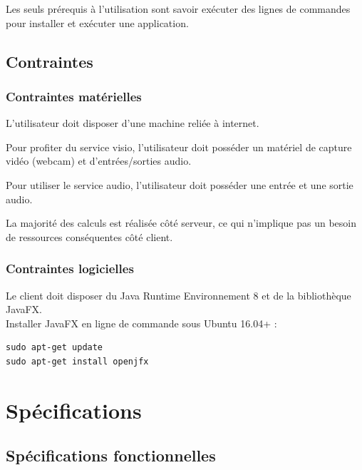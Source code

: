 \documentclass[11pt,dvipsnames,svgnames]{report}
\begin{document}
Les seuls prérequis à l'utilisation sont savoir exécuter des lignes de commandes pour installer et exécuter une application.
\section{Contraintes}
\subsection{Contraintes matérielles}
L'utilisateur doit disposer d'une machine reliée à internet.

Pour profiter du service visio, l'utilisateur doit posséder un matériel de capture vidéo (webcam) et d'entrées/sorties audio.

Pour utiliser le service audio, l'utilisateur doit posséder une entrée et une sortie audio.

La majorité des calculs est réalisée côté serveur, ce qui n'implique pas un besoin de ressources conséquentes côté client.

\subsection{Contraintes logicielles}

Le client doit disposer du Java Runtime Environnement 8 et de la bibliothèque JavaFX.\\

Installer JavaFX en ligne de commande sous Ubuntu 16.04+ :

\begin{lstlisting}
sudo apt-get update
sudo apt-get install openjfx
\end{lstlisting}

\chapter{Spécifications}

\section{Spécifications fonctionnelles}
\end{document}
